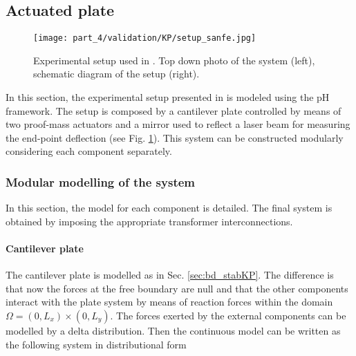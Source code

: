 \subsection{Actuated plate}

\begin{figure}[tb]
	\centering
	\texttt{[image: part\_4/validation/KP/setup\_sanfe.jpg]} 
	\caption{Experimental setup used in \cite{preda2020}. Top down photo of the system (left), schematic diagram of the setup (right).}
	\label{fig:setup_sanfe}
\end{figure}

In this section, the experimental setup presented in \cite{preda2020} is modeled using the pH framework. The setup is composed by a cantilever plate controlled by means of two proof-mass actuators and a mirror used to reflect a laser beam for measuring the end-point deflection (see Fig. \ref{fig:setup_sanfe}).
This system can be constructed modularly considering each component separately. 

\subsubsection{Modular modelling of the system}
In this section, the model for each component is detailed. The final system is obtained by imposing the appropriate transformer interconnections.

\paragraph{Cantilever plate} The cantilever plate is modelled as in Sec. \ref{sec:bd_stabKP}. The difference is that now the forces at the free boundary are null and that the other components interact with the plate system by means of reaction forces within the domain $\Omega = (0, L_x) \times (0, L_y)$. The forces exerted by the external components can be modelled by a delta distribution. Then the continuous model can be written as the following system in distributional form

